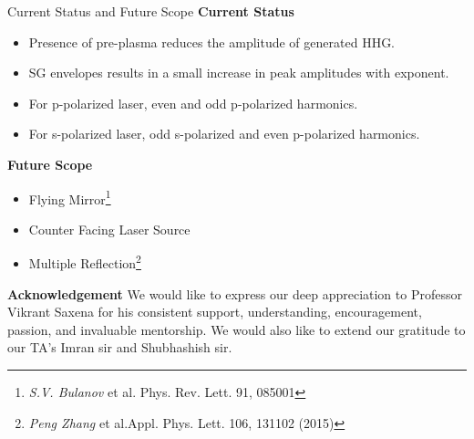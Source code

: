 \documentclass{beamer}
\begin{document}
\begin{frame}{Current Status and Future Scope}
    \small
    \textbf{Current Status}
    \begin{itemize}
        \item Presence of pre-plasma reduces the amplitude of generated HHG.
        \item SG envelopes results in a small increase in peak amplitudes with exponent.
        \item For p-polarized laser, even and odd p-polarized harmonics.
        \item For s-polarized laser, odd s-polarized and even p-polarized harmonics.
    \end{itemize}
    \textbf{Future Scope}
    \begin{itemize}
        \item Flying Mirror\footnote{\textit{S.V. Bulanov} et al. Phys. Rev. Lett. 91, 085001}
        \item Counter Facing Laser Source
        \item Multiple Reflection\footnote{\textit{Peng Zhang} et al.Appl. Phys. Lett. 106, 131102 (2015)}
    \end{itemize}
    \textbf{Acknowledgement}
    We would like to express our deep appreciation to Professor Vikrant Saxena for his consistent support, understanding, encouragement, passion, and invaluable mentorship. We would also like to extend our gratitude to our TA's Imran sir and Shubhashish sir.
\end{frame}
\end{document}

